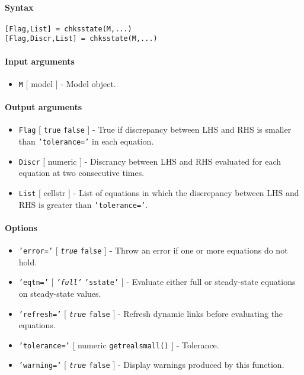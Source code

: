 


	\paragraph{Syntax}\label{syntax}

\begin{verbatim}
[Flag,List] = chksstate(M,...)
[Flag,Discr,List] = chksstate(M,...)
\end{verbatim}

\paragraph{Input arguments}\label{input-arguments}

\begin{itemize}
\itemsep1pt\parskip0pt
\item
  \texttt{M} {[} model {]} - Model object.
\end{itemize}

\paragraph{Output arguments}\label{output-arguments}

\begin{itemize}
\item
  \texttt{Flag} {[} \texttt{true} \textbar{} \texttt{false} {]} - True
  if discrepancy between LHS and RHS is smaller than
  \texttt{'tolerance='} in each equation.
\item
  \texttt{Discr} {[} numeric {]} - Discrancy between LHS and RHS
  evaluated for each equation at two consecutive times.
\item
  \texttt{List} {[} cellstr {]} - List of equations in which the
  discrepancy between LHS and RHS is greater than \texttt{'tolerance='}.
\end{itemize}

\paragraph{Options}\label{options}

\begin{itemize}
\item
  \texttt{'error='} {[} \emph{\texttt{true}} \textbar{} \texttt{false}
  {]} - Throw an error if one or more equations do not hold.
\item
  \texttt{'eqtn='} {[} \emph{\texttt{'full'}} \textbar{}
  \texttt{'sstate'} {]} - Evaluate either full or steady-state equations
  on steady-state values.
\item
  \texttt{'refresh='} {[} \emph{\texttt{true}} \textbar{} \texttt{false}
  {]} - Refresh dynamic links before evaluating the equations.
\item
  \texttt{'tolerance='} {[} numeric \textbar{} \texttt{getrealsmall()}
  {]} - Tolerance.
\item
  \texttt{'warning='} {[} \emph{\texttt{true}} \textbar{} \texttt{false}
  {]} - Display warnings produced by this function.
\end{itemize}

